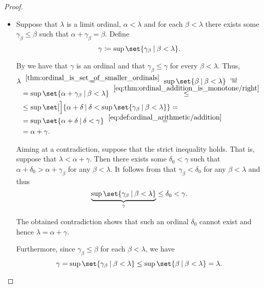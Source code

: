 \begin{proof}
\begin{itemize}
    \item Suppose that \( \lambda \) is a limit ordinal, \( \alpha < \lambda \) and for each \( \beta < \lambda \) there exists some \( \gamma_\beta \leq \beta \) such that \( \alpha + \gamma_\beta = \beta \). Define
    \begin{equation*}
      \gamma \coloneqq \sup\set{ \gamma_\beta \given \beta < \lambda }.
    \end{equation*}

    By  we have that \( \gamma \) is an ordinal and that \( \gamma_\beta \leq \gamma \) for every \( \beta < \lambda \). Thus,
    \begin{align*}
      \lambda
      &\reloset {\ref{thm:ordinal_is_set_of_smaller_ordinals}} =
      \sup\set{ \beta \given \beta < \lambda }
      \reloset {\T{ind.}} = \\ &=
      \sup\set{ \alpha + \gamma_\beta \given \beta < \lambda }
      \reloset {\eqref{eq:thm:ordinal_addition_is_monotone/right}} \leq \\ &\leq
      \sup\set[\Big]{ \alpha + \delta \given \delta < \sup\set{ \gamma_\beta \given \beta < \lambda } }
      = \\ &=
      \sup\set{ \alpha + \delta \given \delta < \gamma }
      \reloset {\eqref{eq:def:ordinal_arithmetic/addition}} = \\ &=
      \alpha + \gamma.
    \end{align*}

    Aiming at a contradiction, suppose that the strict inequality holds. That is, suppose that \( \lambda < \alpha + \gamma \). Then there exists some \( \delta_0 < \gamma \) such that \( \alpha + \delta_0 > \alpha + \gamma_\beta \) for any \( \beta < \lambda \). It follows from  that \( \gamma_\beta < \delta_0 \) for any \( \beta < \lambda \) and thus
    \begin{equation*}
      \underbrace{\sup\set{ \gamma_\beta \given \beta < \lambda }}_{\gamma} \leq \delta_0 < \gamma.
    \end{equation*}

    The obtained contradiction shows that such an ordinal \( \delta_0 \) cannot exist and hence \( \lambda = \alpha + \gamma \).

    Furthermore, since \( \gamma_\beta \leq \beta \) for each \( \beta < \lambda \), we have
    \begin{equation*}
      \gamma
      =
      \sup\set{ \gamma_\beta \given \beta < \lambda }
      \leq
      \sup\set{ \beta \given \beta < \lambda }
      =
      \lambda.
    \end{equation*}
  \end{itemize}


\end{proof}
